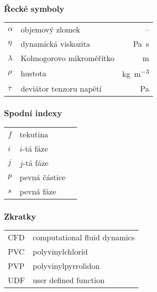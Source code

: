 \subsubsection*{Řecké symboly}
\begin{tabularx}{\textwidth}{@{}p{1.0cm} X r@{}}
$\alpha$ & objemový zlomek& --\\
$\eta$ & dynamická viskozita & \si{\pascal\second} \\
$\lambda$ & Kolmogorovo mikroměřítko  & \si{\meter} \\
$\rho$ & hustota & \si{\kilogram\per\cubic\meter} \\
$\bar{\tau}$ & deviátor tenzoru napětí& \si{\pascal} \\
\end{tabularx}

\subsubsection*{Spodní indexy}
\begin{tabularx}{\textwidth}{@{}p{1.0cm} X r@{}}
$f$ & tekutina & \\
$i$ & $i$-tá fáze & \\
$j$ & $j$-tá fáze & \\
$p$ & pevná částice & \\
$s$ & pevná fáze & \\
\end{tabularx}


\subsubsection*{Zkratky}
\begin{tabularx}{\textwidth}{@{}p{1.0cm} X }
CFD & computational fluid dynamics  \\
PVC & polyvinylchlorid  \\
PVP & polyvinylpyrrolidon  \\
UDF & user defined function  \\
\end{tabularx}
